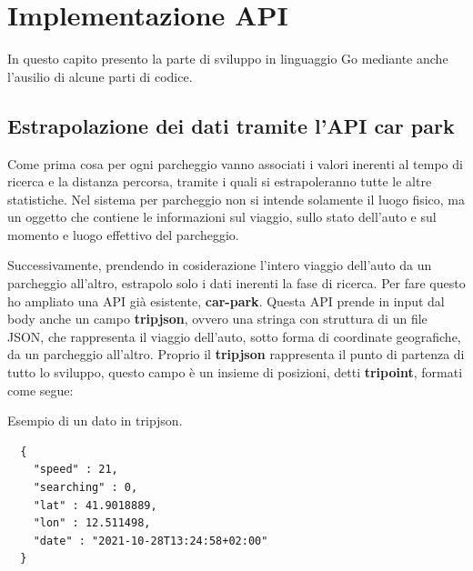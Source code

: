 \documentclass[italian, Lau, oneside, nodefaultfont, noexaminfo]{sapthesis}
\begin{document}

\bigskip

\chapter{Implementazione API}
\label{cap:cap04}

In questo capito presento la parte di sviluppo in linguaggio Go mediante anche l'ausilio di alcune parti di codice.

\section{Estrapolazione dei dati tramite l'API car park}

Come prima cosa per ogni parcheggio vanno associati i valori inerenti al tempo di ricerca e la distanza percorsa, tramite i quali si estrapoleranno tutte le altre statistiche. Nel sistema per parcheggio non si intende solamente il luogo fisico, ma un oggetto che contiene le informazioni sul viaggio, sullo stato dell'auto e sul momento e luogo effettivo del parcheggio.

Successivamente, prendendo in cosiderazione l'intero viaggio dell'auto da un parcheggio all'altro, estrapolo solo i dati inerenti la fase di ricerca. Per fare questo ho ampliato una API già esistente, \textbf{car-park}. Questa API prende in input dal body anche un campo \textbf{tripjson}, ovvero una stringa con struttura di un file JSON, che rappresenta il viaggio dell'auto, sotto forma di coordinate geografiche, da un parcheggio all'altro. Proprio il \textbf{tripjson} rappresenta il punto di partenza di tutto lo sviluppo, questo campo è un insieme di posizioni, detti \textbf{tripoint}, formati come  segue:


\begin{listing}[H]
\caption{Esempio di un dato in tripjson.}
\begin{verbatim}
  {
    "speed" : 21,
    "searching" : 0,
    "lat" : 41.9018889,
    "lon" : 12.511498,
    "date" : "2021-10-28T13:24:58+02:00"
  }
\end{verbatim}
\end{listing}
\end{document}
